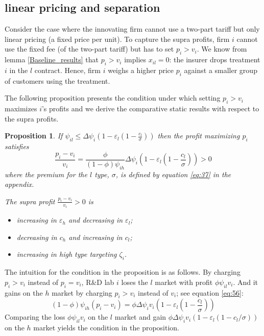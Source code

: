 \documentclass[a4paper,12pt]{article}
\newtheorem{proposition}{Proposition}
\begin{document}
\subsection{linear pricing and separation}
\label{sec:org394eb30}

Consider the case where the innovating firm cannot use a two-part tariff but only linear pricing (a fixed price per unit). To capture the supra profits, firm \(i\) cannot use the fixed fee (of the two-part tariff) but has to set \(p_i > v_i\). We know from lemma \ref{Baseline_results} that \(p_i>v_i\) implies \(x_{il}=0\): the insurer drops treatment \(i\) in the \(l\) contract. Hence, firm \(i\) weighs a higher price \(p_i\) against a smaller group of customers using the treatment.

The following proposition presents the condition under which setting \(p_i>v_i\) maximizes \(i\)'s profits and we derive the comparative static results with respect to the supra profits.
\begin{proposition}
\label{Linear_price_above_value}
If \(\psi_{il} \leq \Delta \psi_i (1-\varepsilon_l (1-\frac{c_l}{\sigma}))\) then the profit maximizing \(p_{i}\) satisfies
\begin{equation}
\label{eq:56}
\frac{p_i-v_i}{v_i} = \frac{\phi}{(1-\phi)\psi_{ih}} \Delta \psi_i (1-\varepsilon_l (1-\frac{c_l}{\sigma})) > 0
\end{equation}
where the premium for the \(l\) type, \(\sigma\), is defined by equation \eqref{eq:37} in the appendix.

The supra profit \(\frac{p_i-v_i}{v_i}>0\) is
\begin{itemize}
\item increasing in \(\varepsilon_h\) and decreasing in \(\varepsilon_l\);
\item decreasing in \(c_h\) and increasing in \(c_l\);
\item increasing in high type targeting \(\zeta_i\).
\end{itemize}
\end{proposition}

The intuition for the condition in the proposition is as follows. By charging \(p_i > v_i\) instead of \(p_i=v_i\), R\&D lab \(i\) loses the \(l\) market with profit \(\phi \psi_{il} v_i\). And it gains on the \(h\) market by charging \(p_i > v_i\) instead of \(v_i\); see equation \eqref{eq:56}:
\begin{equation}
\label{eq:63}
(1-\phi) \psi_{ih} (p_i-v_i)= \phi \Delta \psi_i v_i (1-\varepsilon_l (1-\frac{c_l}{\sigma}))
\end{equation}
Comparing the loss \(\phi \psi_{il} v_i\) on the \(l\) market and gain \(\phi \Delta \psi_i v_i (1-\varepsilon_l (1-c_l/\sigma))\) on the \(h\) market yields the condition in the proposition.
\end{document}
